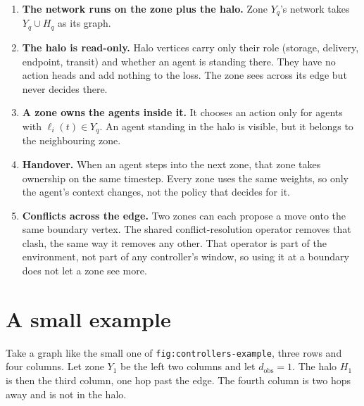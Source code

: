\documentclass[11pt,a4paper]{article}
\begin{document}
\begin{enumerate}[label=\arabic*.,leftmargin=*]
  \item \textbf{The network runs on the zone plus the halo.} Zone $Y_q$'s
        network takes $Y_q \cup H_q$ as its graph.
  \item \textbf{The halo is read-only.} Halo vertices carry only their
        role (storage, delivery, endpoint, transit) and whether an agent is
        standing there. They have no action heads and add nothing to the
        loss. The zone sees across its edge but never decides there.
  \item \textbf{A zone owns the agents inside it.} It chooses an action
        only for agents with $\ell_i(t) \in Y_q$. An agent standing in the
        halo is visible, but it belongs to the neighbouring zone.
  \item \textbf{Handover.} When an agent steps into the next zone, that
        zone takes ownership on the same timestep. Every zone uses the same
        weights, so only the agent's context changes, not the policy that
        decides for it.
  \item \textbf{Conflicts across the edge.} Two zones can each propose a
        move onto the same boundary vertex. The shared conflict-resolution
        operator removes that clash, the same way it removes any other.
        That operator is part of the environment, not part of any
        controller's window, so using it at a boundary does not let a zone
        see more.
\end{enumerate}

\section{A small example}

Take a graph like the small one of \texttt{fig:controllers-example}, three rows and
four columns. Let zone $Y_1$ be the left two columns and let
$d_{\mathrm{obs}} = 1$. The halo $H_1$ is then the third column, one hop
past the edge. The fourth column is two hops away and is not in the halo.
\end{document}

